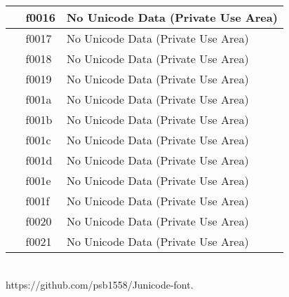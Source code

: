 \documentclass[12pt,letterpaper,openany]{book}
\begin{document}
\begin{center}
\begin{supertabular}{|m{0.25in}|m{0.5in}|m{4in}|}
󰀖 & f0016 & No Unicode Data (Private Use Area)\\\hline
󰀗 & f0017 & No Unicode Data (Private Use Area)\\\hline
󰀘 & f0018 & No Unicode Data (Private Use Area)\\\hline
󰀙 & f0019 & No Unicode Data (Private Use Area)\\\hline
󰀚 & f001a & No Unicode Data (Private Use Area)\\\hline
󰀛 & f001b & No Unicode Data (Private Use Area)\\\hline
󰀜 & f001c & No Unicode Data (Private Use Area)\\\hline
󰀝 & f001d & No Unicode Data (Private Use Area)\\\hline
󰀞 & f001e & No Unicode Data (Private Use Area)\\\hline
󰀟 & f001f & No Unicode Data (Private Use Area)\\\hline
󰀠 & f0020 & No Unicode Data (Private Use Area)\\\hline
󰀡 & f0021 & No Unicode Data (Private Use Area)\\\hline
\end{supertabular}
\end{center}

\vspace*{\fill}
\begin{center}
{}\\
{\color{myRed}https://github.com/psb1558/Junicode-font.}
\end{center}
\end{document}
